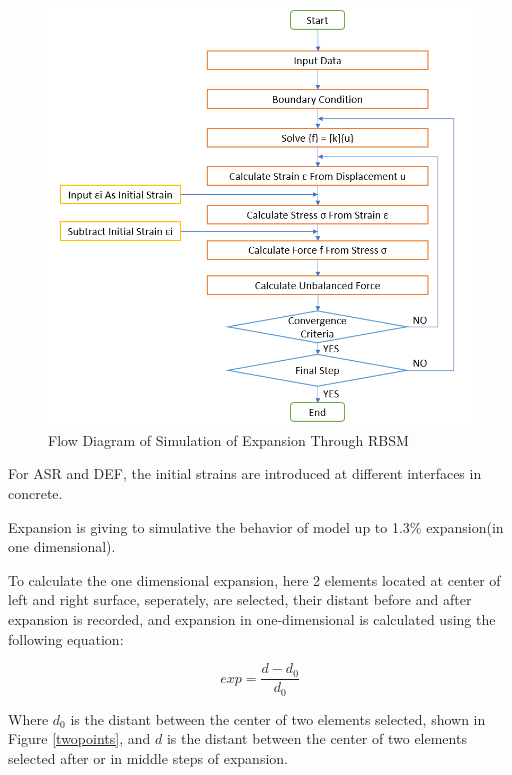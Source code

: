 \begin{figure}[ht!]
    \centering
    \includegraphics[width=1.0\linewidth]{Files/Method/flow.png}
    \caption{Flow Diagram of Simulation of Expansion Through RBSM}
    \label{fig:Flow}
\end{figure}


For ASR and DEF, the initial strains are introduced at different interfaces in concrete.

Expansion is giving to simulative the behavior of model up to 1.3\% expansion(in one dimensional).

To calculate the one dimensional expansion, here 2 elements located at center of left and right surface, seperately, are selected, their distant before and after expansion is recorded, and expansion in one-dimensional is calculated using the following equation:

\begin{equation}
  exp = \frac{d-d_0}{d_0}
\end{equation}

Where $d_0$ is the distant between the center of two elements selected, shown in Figure \ref{twopoints}, and $d$ is the distant between the center of two elements selected after or in middle steps of expansion.


